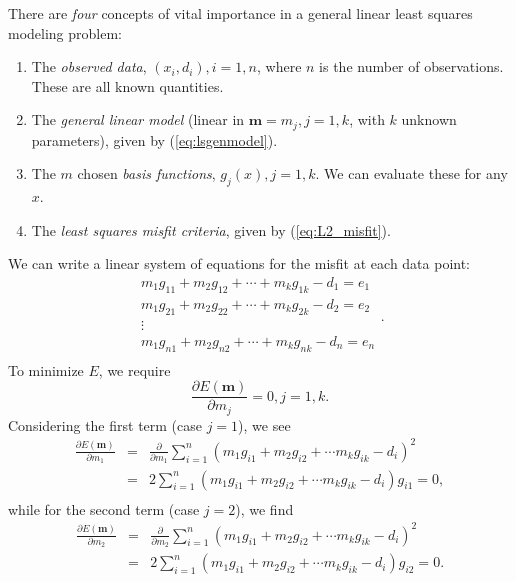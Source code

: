 There are \emph{four} concepts of vital importance in a general linear least squares modeling problem:
\begin{enumerate}
	\item The \emph{observed data}, $(x_i, d_i), i = 1, n$, where $n$ is the number of observations.  These are all known quantities.
	\item The \emph{general linear model} (linear in $\mathbf{m} = m_j, j = 1,k$, with $k$ unknown parameters), given by (\ref{eq:lsgenmodel}).
	\item The $m$ chosen \emph{basis functions}, $g_j(x), j = 1, k$.  We can evaluate these for any $x$.
	\item The \emph{least squares misfit criteria}, given by (\ref{eq:L2_misfit}).
\end{enumerate}
We can write a linear system of equations for the misfit at each data point:
\begin{equation}
\begin{array}{c}
m_1 g_{11} + m_2 g_{12} + \cdots + m_k g_{1k} - d_1 = e_1\\
m_1 g_{21} + m_2 g_{22} + \cdots + m_k g_{2k} - d_2 = e_2\\
\vdots\\
m_1 g_{n1} + m_2 g_{n2} + \cdots + m_k g_{nk} - d_n = e_n\\
\end{array}.
\end{equation}     
To minimize $E$, we require
\begin{equation}
\displaystyle
\frac{\partial E(\mathbf{m})}{\partial m_{j}} = 0, j = 1,k.
\label{eq:L2_criteria}
\end{equation}
Considering the first term (case $j = 1$), we see
\begin{equation}
\begin{array}{rcl}
\displaystyle \frac{\partial E(\mathbf{m})}{\partial m_1} & = & \displaystyle \frac{\partial}{\partial m_1}\sum ^n _{i=1}(m_1g_{i1} + m_2g_{i2} + \cdots m_k g_{ik} -d_i)^2 \\
 & = & \displaystyle 2 \sum ^n _{i=1}(m_1g_{i1} + m_2g_{i2} + \cdots m_k g_{ik} -d_i)g_{i1}= 0, \\
\end{array}
\end{equation}
while for the second term (case $j = 2$), we find
\begin{equation}
\begin{array}{rcl} 
\displaystyle \frac{\partial E(\mathbf{m})}{\partial m_2} & = & \displaystyle \frac{\partial}{\partial m_2}\sum ^n _{i=1}(m_1g_{i1} + m_2g_{i2} + \cdots m_k g_{ik} -d_i)^2 \\
& = & 2 \displaystyle \sum ^n _{i=1}(m_1g_{i1} + m_2g_{i2} + \cdots m_k g_{ik} -d_i)g_{i2}= 0. \\
\end{array}
\end{equation}
